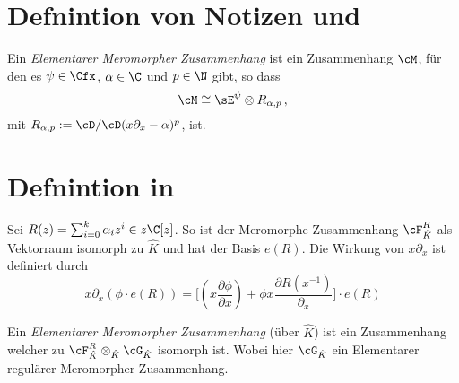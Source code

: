 \section{Defnintion von Notizen und \cite[Cor 5.2.6]{sabbah_cimpa90}}
\begin{defn}
Ein \emph{Elementarer Meromorpher Zusammenhang} ist ein Zusammenhang $\cM$, für
den es $\psi \in \Cfx$, $\alpha\in\C$ und $p\in \N$ gibt, so dass
\[
\cM\cong \sE^{\psi}\otimes R_{\alpha,p}\,,
\]
mit $R_{\alpha,p}:=\cD/\cD(x\partial_x-\alpha)^p$, ist.
\begin{comment}
Sind die Regulär?
\end{comment}
\end{defn}

\section{Defnintion in \cite{sabbah_cimpa90}}
\begin{comment}
in \cite{sabbah_cimpa90} Teil 5.4.4 Seite 34
\end{comment}
\begin{defn}
Sei $R(z)=\sum_{i=0}^k\alpha_iz^i\in z\C[z]$.
So ist der Meromorphe Zusammenhang $\cF_{\hat K}^R$ als Vektorraum isomorph zu
$\hat K$ und hat der Basis $e(R)$.
Die Wirkung von $x\partial_x$ ist definiert durch
\[
x\partial_x(\phi\cdot e(R))=\Big[ (x\frac{\partial \phi}{\partial x}) 
  +\phi x \frac{\partial R(x^{-1})}{\partial_x} \Big]\cdot e(R)
\]
\begin{comment}
hat das was mit fourier zu tun
\end{comment}
\begin{comment}
This means that $e(R)$ plays the role of $\exp R(x^{-1})$.
\end{comment}
\end{defn}
\begin{defn}
Ein \emph{Elementarer Meromorpher Zusammenhang} (über $\hat K$) ist ein Zusammenhang
welcher zu 
$\cF_{\hat K}^R\otimes_{\hat K} \cG_{\hat K}$
isomorph ist. Wobei hier $\cG_{\hat K}$ ein Elementarer regulärer Meromorpher
Zusammenhang.
\end{defn}

